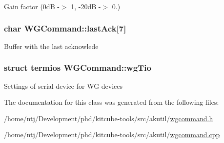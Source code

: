 Gain factor (0d\-B -\/$>$ 1, -\/20d\-B -\/$>$ 0.) \hypertarget{classWGCommand_a05dbd3492228efc134722a23daff633f}{
\subsubsection[{last\-Ack}]{\setlength{\rightskip}{0pt plus 5cm}char W\-G\-Command\-::last\-Ack\mbox{[}7\mbox{]}\hspace{0.3cm}{\ttfamily [private]}}}\label{classWGCommand_a05dbd3492228efc134722a23daff633f}
Buffer with the last acknowlede \hypertarget{classWGCommand_a82bdfe137d61716e32ffd2b7dd69d9e2}{
\subsubsection[{wg\-Tio}]{\setlength{\rightskip}{0pt plus 5cm}struct termios W\-G\-Command\-::wg\-Tio\hspace{0.3cm}{\ttfamily [private]}}}\label{classWGCommand_a82bdfe137d61716e32ffd2b7dd69d9e2}
Settings of serial device for W\-G devices 

The documentation for this class was generated from the following files\-:\begin{DoxyCompactItemize}
\item 
/home/ntj/\-Development/phd/kitcube-\/tools/src/akutil/\hyperlink{wgcommand_8h}{wgcommand.\-h}\item 
/home/ntj/\-Development/phd/kitcube-\/tools/src/akutil/\hyperlink{wgcommand_8cpp}{wgcommand.\-cpp}\end{DoxyCompactItemize}
